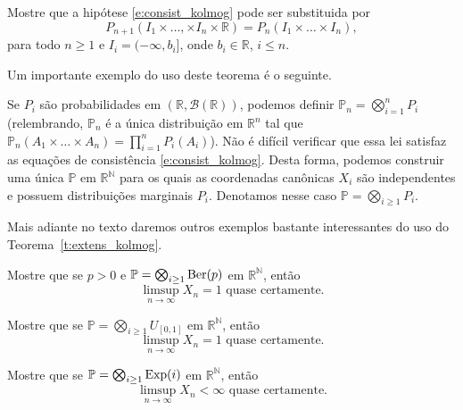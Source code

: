 \begin{exercise}
  Mostre que a hipótese \eqref{e:consist_kolmog} pode ser substituida por
  \begin{equation}
    P_{n+1} (I_1 \times \dots, \times I_n \times \mathbb{R}) = P_n (I_1 \times \dots \times I_n),
  \end{equation}
  para todo $n \geq 1$ e $I_i = (-\infty, b_i]$, onde $b_i \in \mathbb{R}$, $i \leq n$.
\end{exercise}

Um importante exemplo do uso deste teorema é o seguinte.

\begin{example}
  Se $P_i$ são probabilidades em $(\mathbb{R}, \mathcal{B}(\mathbb{R}))$, podemos definir $\mathbb{P}_n = \bigotimes_{i=1}^n P_i$ (relembrando, $\mathbb{P}_n$ é a única distribuição em $\mathbb{R}^n$ tal que $\mathbb{P}_n(A_1 \times \dots \times A_n) = \prod_{i=1}^n P_i(A_i)$).
  Não é difícil verificar que essa lei satisfaz as equações de consistência \eqref{e:consist_kolmog}.
  Desta forma, podemos construir uma única $\mathbb{P}$ em $\mathbb{R}^\mathbb{N}$ para os quais as coordenadas canônicas $X_i$ são independentes e possuem distribuições marginais $P_i$.
  Denotamos nesse caso $\mathbb{P} = \bigotimes_{i \geq 1} P_i$.
\end{example}

Mais adiante no texto daremos outros exemplos bastante interessantes do uso do Teorema~\ref{t:extens_kolmog}.

\begin{exercise}
  Mostre que se $p > 0$ e $\mathbb{P} = \bigotimes_{i \geq 1} \operatorname{Ber}(p)$ em $\mathbb{R}^\mathbb{N}$, então
  \begin{equation}
    \text{$\limsup_{n\to \infty} X_n = 1$ quase certamente.}
  \end{equation}
\end{exercise}

\begin{exercise}
  Mostre que se $\mathbb{P} = \bigotimes_{i \geq 1} U_{[0,1]}$ em $\mathbb{R}^\mathbb{N}$, então
  \begin{equation}
    \text{$\limsup_{n\to \infty} X_n = 1$ quase certamente.}
  \end{equation}
\end{exercise}

\begin{exercise}
  Mostre que se $\mathbb{P} = \bigotimes_{i \geq 1} \operatorname{Exp}(i)$ em $\mathbb{R}^\mathbb{N}$, então
  \begin{equation}
    \text{$\limsup_{n\to \infty} X_n < \infty$ quase certamente.}
  \end{equation}
\end{exercise}

